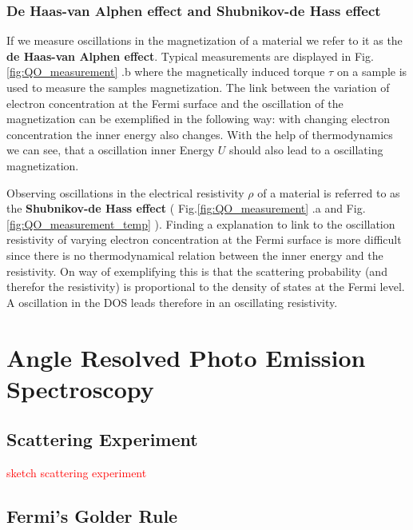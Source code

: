 \documentclass[10pt]{report}
\numberwithin{equation}{chapter}
\newcommand{\myRef}[1]{
  Fig.\ref{#1}
}
\begin{document}
\subsubsection{De Haas-van Alphen effect and Shubnikov-de Hass effect}

If we measure oscillations in the magnetization of a material we refer to it as the \textbf{de Haas-van Alphen effect}. Typical measurements are displayed in \myRef{fig:QO_measurement}.b where the magnetically induced torque $\tau$ on a sample is used to measure the samples magnetization. 
The link between the variation of electron concentration at the Fermi surface and the oscillation of the magnetization can be exemplified in the following way: with changing electron concentration the inner energy also changes. 
With the help of thermodynamics we can see, that a oscillation inner Energy $U$ should also lead to a oscillating magnetization.

Observing oscillations in the electrical resistivity $\rho$ of a material is referred to as the \textbf{Shubnikov-de Hass effect} (\myRef{fig:QO_measurement}.a and \myRef{fig:QO_measurement_temp}). 
Finding a explanation to link to the oscillation resistivity of varying electron concentration at the Fermi surface is more difficult since there is no thermodynamical relation between the inner energy and the resistivity. 
On way of exemplifying this is that the scattering probability (and therefor the resistivity) is proportional to the density of states at the Fermi level. 
A oscillation in the DOS leads therefore in an oscillating resistivity.



%
\section{Angle Resolved Photo Emission Spectroscopy}

\subsection{Scattering Experiment}

\textcolor{red}{sketch scattering experiment}

\subsection{Fermi's Golder Rule}
\end{document}
